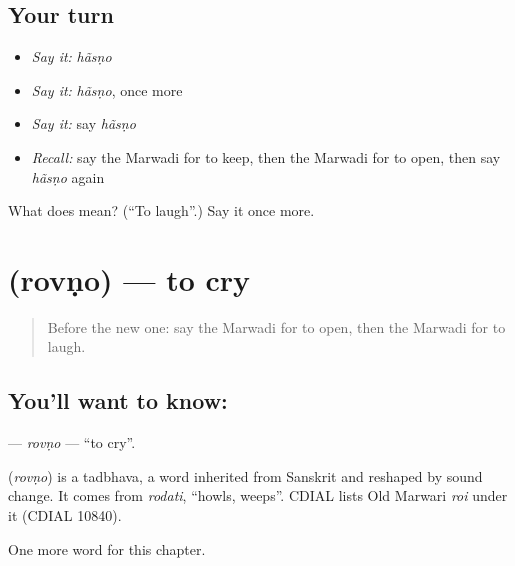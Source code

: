 \subsection*{Your turn}
\begin{itemize}
\raggedright
  \item \emph{Say it:} \emph{hãsṇo}
  \item \emph{Say it:} \emph{hãsṇo}, once more
  \item \emph{Say it:} say \emph{hãsṇo}
  \item \emph{Recall:} say the Marwadi for to keep, then the Marwadi for to open, then say \emph{hãsṇo} again
\end{itemize}

\begin{tcolorbox}[breakable,colback=teal!4,colframe=teal!35!black,title={Before you move on}]
What does  mean? (\textquotedblleft{}To laugh\textquotedblright{}.) Say it once more.
\end{tcolorbox}
\section[\texorpdfstring{\mw{रोवणो} (rovṇo)}{रोवणो (rovṇo)}]{ (rovṇo) — to cry}

\label{lesson:MW-C54-rovno}



\begin{quote}
Before the new one: say the Marwadi for to open, then the Marwadi for to laugh.
\end{quote}

\subsection*{You'll want to know: }
\textbf{} — \emph{rovṇo} — \textquotedblleft{}to cry\textquotedblright{}.

\begin{cousinweb}
\textbf{} (\emph{rovṇo}) is a tadbhava, a word inherited from Sanskrit and reshaped by sound change. It comes from \emph{rodati}, \textquotedblleft{}howls, weeps\textquotedblright{}. CDIAL lists Old Marwari \emph{roi} under it (CDIAL 10840).
\end{cousinweb}

\begin{grammarlens}[title={What you've built}]
One more word for this chapter.
\end{grammarlens}

